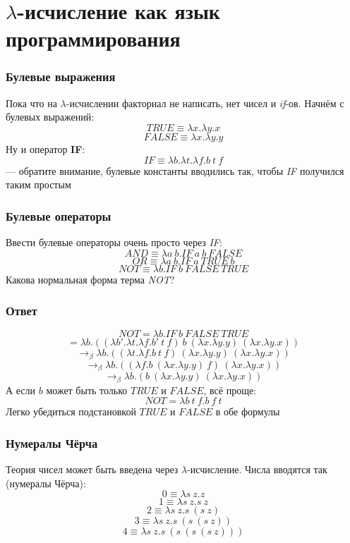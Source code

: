 \documentclass[xetex,mathserif,serif]{beamer}
\begin{document}
    \section{$\lambda$-исчисление как язык программирования}

    \begin{frame}
        \frametitle{Булевые выражения}
        Пока что на $\lambda$-исчислении факториал не написать, нет чисел и \textit{if}-ов. Начнём с булевых выражений:
        $$TRUE \equiv \lambda x.\lambda y.x$$
        $$FALSE \equiv \lambda x.\lambda y.y$$
        Ну и оператор \textbf{IF}:
        $$IF \equiv \lambda b.\lambda t.\lambda f.b\ t\ f$$
        --- обратите внимание, булевые константы вводились так, чтобы \textit{IF} получился таким простым
    \end{frame}

    \begin{frame}
        \frametitle{Булевые операторы}
        Ввести булевые операторы очень просто через \textit{IF}:
        $$AND \equiv \lambda a\ b. IF\ a\ b\ FALSE$$
        $$OR \equiv \lambda a\ b. IF\ a\ TRUE\ b$$
        $$NOT \equiv \lambda b.IF\ b\ FALSE\ TRUE$$
        Какова нормальная форма терма \textit{NOT}?
    \end{frame}

    \begin{frame}
        \frametitle{Ответ}
        $$NOT = \lambda b.IF\ b\ FALSE\ TRUE$$
        $$= \lambda b.((\lambda b'.\lambda t.\lambda f.b'\ t\ f)\ b\ (\lambda x.\lambda y.y)\ (\lambda x.\lambda y.x))$$
        $$\rightarrow_\beta \lambda b.((\lambda t.\lambda f.b\ t\ f)\ (\lambda x.\lambda y.y)\ (\lambda x.\lambda y.x))$$
        $$\rightarrow_\beta \lambda b.((\lambda f.b\ (\lambda x.\lambda y.y)\ f)\ (\lambda x.\lambda y.x))$$
        $$\rightarrow_\beta \lambda b.(b\ (\lambda x.\lambda y.y)\ (\lambda x.\lambda y.x))$$
        А если $b$ может быть только $TRUE$ и $FALSE$, всё проще:
        $$NOT = \lambda b\ t\ f.b\ f\ t$$
        Легко убедиться подстановкой $TRUE$ и $FALSE$ в обе формулы
    \end{frame}

    \begin{frame}
        \frametitle{Нумералы Чёрча}
        Теория чисел может быть введена через $\lambda$-исчисление. Числа вводятся так (нумералы Чёрча):
        $$0 \equiv \lambda s\ z.z$$
        $$1 \equiv \lambda s\ z.s\ z$$
        $$2 \equiv \lambda s\ z.s\ (s\ z)$$
        $$3 \equiv \lambda s\ z.s\ (s\ (s\ z))$$
        $$4 \equiv \lambda s\ z.s\ (s\ (s\ (s\ z)))$$
    \end{frame}
\end{document}
